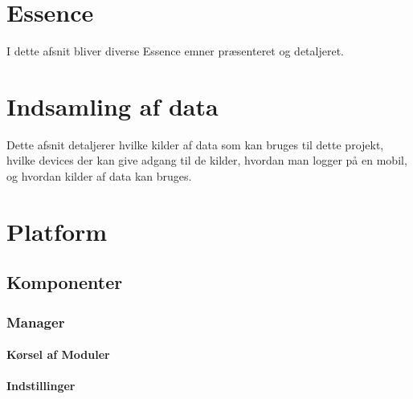 












\chapter{Essence}
I dette afsnit bliver diverse Essence emner præsenteret og detaljeret.


%



\chapter{Indsamling af data}
Dette afsnit detaljerer hvilke kilder af data som kan bruges til dette projekt, hvilke devices der kan give adgang til de kilder, hvordan man logger på en mobil, og hvordan kilder af data kan bruges.






\chapter{Platform}





\section{Komponenter}

\subsection{Manager}

\subsubsection{Kørsel af Moduler}

\subsubsection{Indstillinger}

